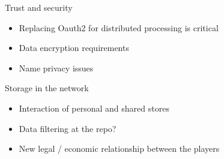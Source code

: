 Trust and security
\begin{itemize}
\item Replacing Oauth2 for distributed processing is critical
\item Data encryption requirements
\item Name privacy issues
\end{itemize}

Storage in the network
\begin{itemize}
\item Interaction of personal and shared stores
\item Data filtering at the repo?
\item New legal / economic relationship between the players
\end{itemize}